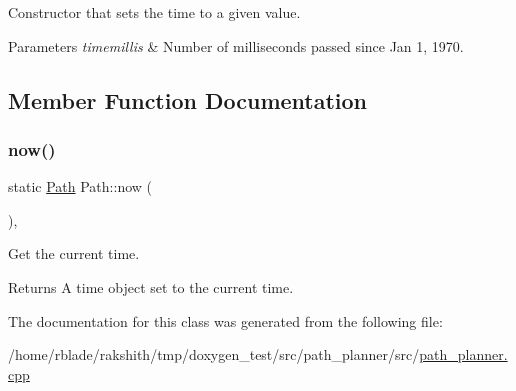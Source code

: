 Constructor that sets the time to a given value.


\begin{DoxyParams}{Parameters}
{\em timemillis} & Number of milliseconds passed since Jan 1, 1970. \\
\hline
\end{DoxyParams}


\subsection{Member Function Documentation}
\mbox{\label{classPath_a7e6c6833d0a1e919466d9c30917183fb}} 
\subsubsection{\texorpdfstring{now()}{now()}}
{\footnotesize\ttfamily static \hyperlink{classPath}{Path} Path\+::now (\begin{DoxyParamCaption}{ }\end{DoxyParamCaption})\hspace{0.3cm}{\ttfamily [inline]}, {\ttfamily [static]}}

Get the current time.

\begin{DoxyReturn}{Returns}
A time object set to the current time. 
\end{DoxyReturn}


The documentation for this class was generated from the following file\+:\begin{DoxyCompactItemize}
\item 
/home/rblade/rakshith/tmp/doxygen\+\_\+test/src/path\+\_\+planner/src/\hyperlink{path__planner_8cpp}{path\+\_\+planner.\+cpp}\end{DoxyCompactItemize}
